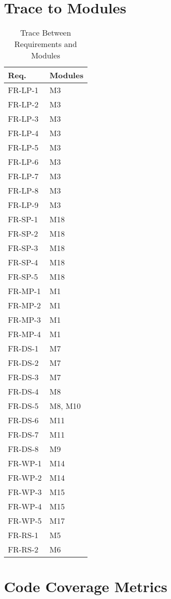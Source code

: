 \documentclass[12pt, titlepage]{article}
\begin{document}
\section{Trace to Modules}		
\begin{table}[H]
\centering
\small
\renewcommand{\arraystretch}{0.9}
\begin{tabular}{p{} p{}}
	\toprule
	\textbf{Req.} & \textbf{Modules}\\
	\midrule
	FR-LP-1 & M3\\
	FR-LP-2 & M3\\
	FR-LP-3 & M3\\
	FR-LP-4 & M3\\
	FR-LP-5 & M3\\
	FR-LP-6 & M3\\
	FR-LP-7 & M3\\
	FR-LP-8 & M3\\
	FR-LP-9 & M3\\
	FR-SP-1 & M18\\
	FR-SP-2 & M18\\
	FR-SP-3 & M18\\
	FR-SP-4 & M18\\
	FR-SP-5 & M18\\
	FR-MP-1 & M1\\
	FR-MP-2 & M1\\
	FR-MP-3 & M1\\
	FR-MP-4 & M1\\
	FR-DS-1 & M7\\
	FR-DS-2 & M7\\
	FR-DS-3 & M7\\
	FR-DS-4 & M8\\
	FR-DS-5 & M8, M10\\
	FR-DS-6 & M11\\
	FR-DS-7 & M11\\
	FR-DS-8 & M9\\
	FR-WP-1 & M14\\
	FR-WP-2 & M14\\
	FR-WP-3 & M15\\
	FR-WP-4 & M15\\
	FR-WP-5 & M17\\
	FR-RS-1 & M5\\
	FR-RS-2 & M6\\
	\bottomrule
\end{tabular}
\caption{Trace Between Requirements and Modules}
\label{TblRT}
\end{table}
\section{Code Coverage Metrics}
\end{document}
